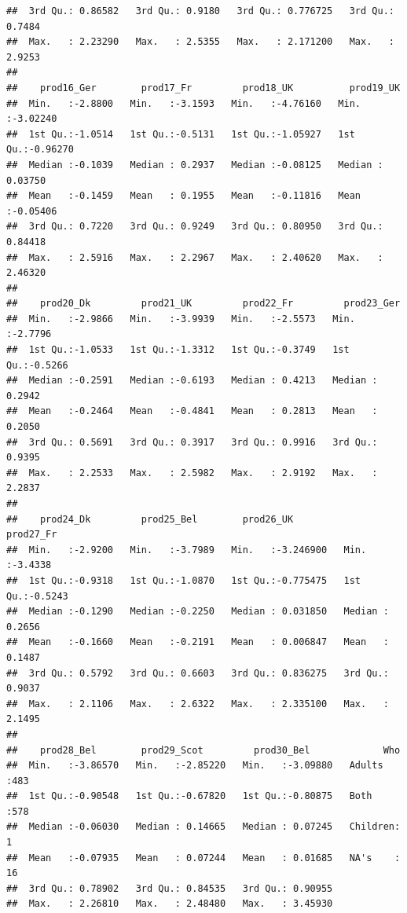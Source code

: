 \documentclass[
]{book}
\begin{document}
\begin{verbatim}
##  3rd Qu.: 0.86582   3rd Qu.: 0.9180   3rd Qu.: 0.776725   3rd Qu.: 0.7484  
##  Max.   : 2.23290   Max.   : 2.5355   Max.   : 2.171200   Max.   : 2.9253  
##                                                                            
##    prod16_Ger        prod17_Fr         prod18_UK          prod19_UK       
##  Min.   :-2.8800   Min.   :-3.1593   Min.   :-4.76160   Min.   :-3.02240  
##  1st Qu.:-1.0514   1st Qu.:-0.5131   1st Qu.:-1.05927   1st Qu.:-0.96270  
##  Median :-0.1039   Median : 0.2937   Median :-0.08125   Median : 0.03750  
##  Mean   :-0.1459   Mean   : 0.1955   Mean   :-0.11816   Mean   :-0.05406  
##  3rd Qu.: 0.7220   3rd Qu.: 0.9249   3rd Qu.: 0.80950   3rd Qu.: 0.84418  
##  Max.   : 2.5916   Max.   : 2.2967   Max.   : 2.40620   Max.   : 2.46320  
##                                                                           
##    prod20_Dk         prod21_UK         prod22_Fr         prod23_Ger     
##  Min.   :-2.9866   Min.   :-3.9939   Min.   :-2.5573   Min.   :-2.7796  
##  1st Qu.:-1.0533   1st Qu.:-1.3312   1st Qu.:-0.3749   1st Qu.:-0.5266  
##  Median :-0.2591   Median :-0.6193   Median : 0.4213   Median : 0.2942  
##  Mean   :-0.2464   Mean   :-0.4841   Mean   : 0.2813   Mean   : 0.2050  
##  3rd Qu.: 0.5691   3rd Qu.: 0.3917   3rd Qu.: 0.9916   3rd Qu.: 0.9395  
##  Max.   : 2.2533   Max.   : 2.5982   Max.   : 2.9192   Max.   : 2.2837  
##                                                                         
##    prod24_Dk         prod25_Bel        prod26_UK           prod27_Fr      
##  Min.   :-2.9200   Min.   :-3.7989   Min.   :-3.246900   Min.   :-3.4338  
##  1st Qu.:-0.9318   1st Qu.:-1.0870   1st Qu.:-0.775475   1st Qu.:-0.5243  
##  Median :-0.1290   Median :-0.2250   Median : 0.031850   Median : 0.2656  
##  Mean   :-0.1660   Mean   :-0.2191   Mean   : 0.006847   Mean   : 0.1487  
##  3rd Qu.: 0.5792   3rd Qu.: 0.6603   3rd Qu.: 0.836275   3rd Qu.: 0.9037  
##  Max.   : 2.1106   Max.   : 2.6322   Max.   : 2.335100   Max.   : 2.1495  
##                                                                           
##    prod28_Bel        prod29_Scot         prod30_Bel             Who     
##  Min.   :-3.86570   Min.   :-2.85220   Min.   :-3.09880   Adults  :483  
##  1st Qu.:-0.90548   1st Qu.:-0.67820   1st Qu.:-0.80875   Both    :578  
##  Median :-0.06030   Median : 0.14665   Median : 0.07245   Children:  1  
##  Mean   :-0.07935   Mean   : 0.07244   Mean   : 0.01685   NA's    : 16  
##  3rd Qu.: 0.78902   3rd Qu.: 0.84535   3rd Qu.: 0.90955                 
##  Max.   : 2.26810   Max.   : 2.48480   Max.   : 3.45930                 

\end{verbatim}
\end{document}
